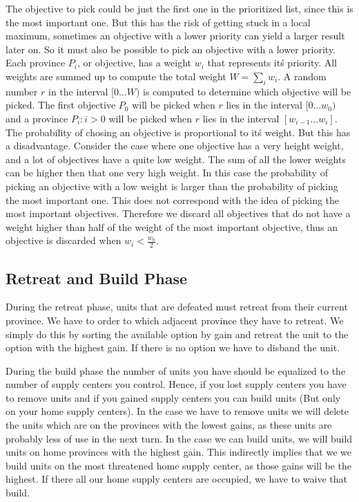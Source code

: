\documentclass[a4paper]{article} %
\begin{document}
The objective to pick could be just the first one in the prioritized list, since this is the most important one. But this has the risk of getting stuck in a local maximum, sometimes an objective with a lower priority can yield a larger result later on. So it must also be possible to pick an objective with a lower priority. Each province $P_{i}$, or objective, has a weight $w_{i}$ that represents it\'s priority. All weights are summed up to compute the total weight $W=\sum_{i}w_{i}$. A random number $r$ in the interval $[0...W)$ is computed to determine which objective will be picked. The first objective $P_{0}$ will be picked when $r$ lies in the interval $[0...w_{0})$ and a province $P_{i}:i>0$ will be picked when $r$ lies in the interval $[w_{i-1}...w_{i}]$. The probability of chosing an objective is proportional to it\'s weight. But this has a disadvantage. Consider the case where one objective has a very height weight, and a lot of objectives have a quite low weight. The sum of all the lower weights can be higher then that one very high weight. In this case the probability of picking an objective with a low weight is larger than the probability of picking the most important one. This does not correspond with the idea of picking the most important objectives. Therefore we discard all objectives that do not have a weight higher than half of the weight of the most important objective, thus an objective is discarded when $w_{i} < \frac{w_{0}}{2}$.

\subsection{Retreat and Build Phase}

During the retreat phase, units that are defeated must retreat from their current province. We have to order to which adjacent province they have to retreat. We simply do this by sorting the available option by gain and retreat the unit to the option with the highest gain. If there is no option we have to disband the unit. 

During the build phase the number of units you have should be equalized to the number of supply centers you control. Hence, if you lost supply centers you have to remove units and if you gained supply centers you can build units (But only on your home supply centers). In the case we have to remove units we will delete the units which are on the provinces with the lowest gains, as these units are probably less of use in the next turn. In the case we can build units, we will build units on home provinces with the highest gain. This indirectly implies that we we build units on the most threatened home supply center, as those gains will be the highest. If there all our home supply centers are occupied, we have to waive that build.    
\end{document}
